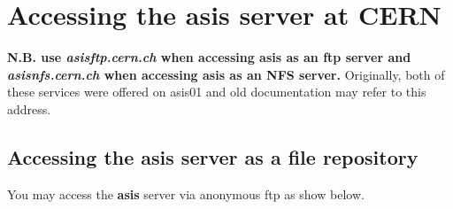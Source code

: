\chapter{Accessing the asis server at CERN}
\label{sect-ASIS}

{\bf N.B. use {\it asisftp.cern.ch} when accessing asis
as an ftp server and {\it asisnfs.cern.ch} when accessing
asis as an NFS server.} Originally, both of these services
were offered on asis01 and old documentation may refer to
this address. 

\section{Accessing the asis server as a file repository}
You may access the {\bf asis} server via anonymous ftp as show below.

